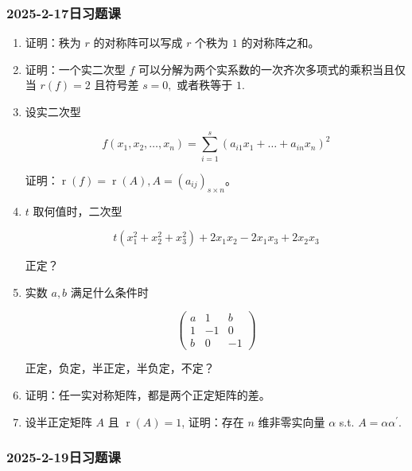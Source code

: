 \subsubsection{2025-2-17日习题课}

\begin{enumerate}
    \item 证明：秩为 $r$ 的对称阵可以写成 $r$ 个秩为 $1$ 的对称阵之和。
    \item 证明：一个实二次型 $f$ 可以分解为两个实系数的一次齐次多项式的乘积当且仅当 $r(f)=2$ 且符号差 $s=0,$ 或者秩等于 $1.$
    \item 设实二次型

    $$
    f(x_1,x_2,\dots,x_n)=\sum^s_{i=1}(a_{i1}x_1+\dots+a_{in}x_n)^2
    $$
    
    证明：$\operatorname{r}(f)=\operatorname{r}(A),A=(a_{ij})_{s \times n}$。
    \item $t$ 取何值时，二次型

$$
t(x_1^2+x_2^2+x_3^2)+2x_1x_2-2x_1x_3+2x_2x_3
$$

正定？
    \item 实数 $a, b$ 满足什么条件时

    $$
    \begin{pmatrix}
    a & 1 & b \\
    1 & -1 & 0 \\
    b & 0 & -1
    \end{pmatrix}
    $$
    
    正定，负定，半正定，半负定，不定？
    \item 证明：任一实对称矩阵，都是两个正定矩阵的差。
    \item 设半正定矩阵 $A$ 且 $\operatorname{r}(A)=1$, 证明：存在 $n$ 维非零实向量 $\alpha$ s.t. $A=\alpha \alpha^{\prime}$.
\end{enumerate}

\subsubsection{2025-2-19日习题课}


